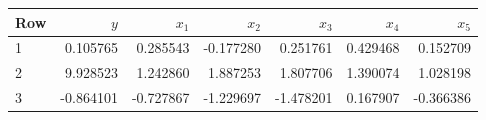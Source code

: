 \begin{center}
\small
\setlength{\tabcolsep}{4pt}
\begin{tabular}{lrrrrrr}
\toprule
Row & $y$ & $x_1$ & $x_2$ & $x_3$ & $x_4$ & $x_5$ \\
\midrule
1 & 0.105765 & 0.285543 & -0.177280 & 0.251761 & 0.429468 & 0.152709 \\
2 & 9.928523 & 1.242860 & 1.887253 & 1.807706 & 1.390074 & 1.028198 \\
3 & -0.864101 & -0.727867 & -1.229697 & -1.478201 & 0.167907 & -0.366386 \\
\bottomrule
\end{tabular}
\end{center}
